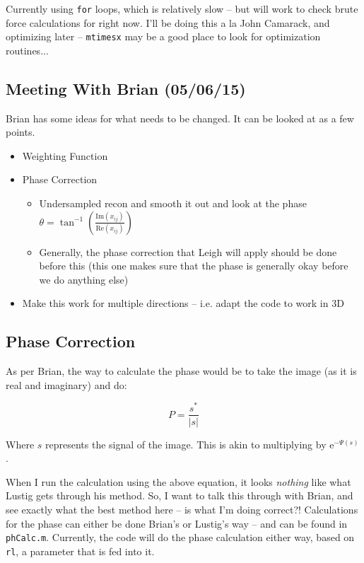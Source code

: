 \documentclass[11 pt]{article}
\newcommand{\me}{\mathrm{e}}
\begin{document}
  Currently using \texttt{for} loops, which is relatively slow -- but will work to check brute force calculations for right now. I'll be doing this a la John Camarack, and optimizing later -- \texttt{mtimesx} may be a good place to look for optimization routines...
  
  \subsection{Meeting With Brian (05/06/15)}
    Brian has some ideas for what needs to be changed. It can be looked at as a few points.
    \begin{itemize}
      \item Weighting Function
      \item Phase Correction
        \begin{itemize}
          \item Undersampled recon and smooth it out and look at the phase 
          $
          \theta = \tan^{-1}
          \left(
          \frac{\text{Im}(x_{ij})}
               {\text{Re}(x_{ij})}
               \right)
          $
          \item Generally, the phase correction that Leigh will apply should be done before this (this one makes sure that the phase is generally okay before we do anything else)
          \end{itemize}

      \item Make this work for multiple directions -- i.e. adapt the code to work in 3D
      \end{itemize}


  \subsection{Phase Correction}
    As per Brian, the way to calculate the phase would be to take the image (as it is real and imaginary) and do:

    \[ P = \frac{s^*}{|s|} \]

    Where $s$ represents the signal of the image. This is akin to multiplying by $\me^{-\Psi(s)}$.

    When I run the calculation using the above equation, it looks \emph{nothing} like what Lustig gets through his method. So, I want to talk this through with Brian, and see exactly what the best method here -- is what I'm doing correct?! Calculations for the phase can either be done Brian's or Lustig's way -- and can be found in \texttt{phCalc.m}. Currently, the code will do the phase calculation either way, based on \texttt{rl}, a parameter that is fed into it. 
\end{document}
